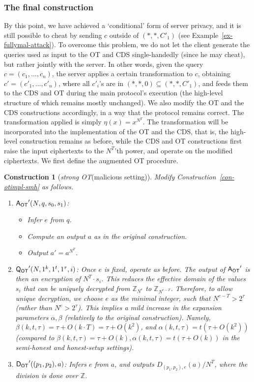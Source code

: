 \documentclass[11pt]{article}
\newtheorem{construction}[theorem]{Construction}
\newcommand{\queot}{{\sf Q_{OT}}}
\newcommand{\ansot}{{\sf A_{OT}}}
\newcommand{\decot}{{\sf D_{OT}}}
\newcommand{\otl}{{\tau}}
\newcommand{\decdj}{{D}_{(p_1,p_2),e}}
\newcommand{\Z}{\mathbb{Z}}
\newcommand\ot{\mbox{OT}\xspace}
\newcommand\strongot{{\em strong \ot\xspace}}
\begin{document}
\subsubsection{The final construction}
\label{subsec-mal-uncond}
By this point, we have achieved a `conditional' form of server privacy, and it is still possible
to cheat by sending $c$ outside of $(*,*,C'_1)$ (see Example~\ref{ex-fullymal-attack}).
To overcome this problem, we do not let the client
generate the queries used as input to the \ot and CDS single-handedly (since he may cheat), but rather
jointly with the server. In other words, given the query $c=(c_1,\ldots,c_n)$, the server applies a certain transformation to $c$, obtaining $c'=(c'_1,\ldots,c'_n)$, where all $c'_i$'s are in $(*,*,0)\subseteq{(*,*,C'_1)}$, and feeds them to the CDS and \ot during the main protocol's execution (the high-level structure of which remains mostly unchanged). We also modify the \ot and the CDS constructions accordingly, in a way that the protocol remains correct.
The transformation applied is simply $\eta(x)=x^{N^T}$. The transformation will be incorporated into the implementation of the \ot and the CDS, that is, the high-level construction remains as before, while the CDS and \ot constructions first raise the input ciphertexts to the $N^T$'th power, and operate on the modified ciphertexts. We first define the augmented \ot procedure.
\begin{construction}[\strongot (malicious setting)]
  \label{con-otimpl-mal}
  Modify Construction~\ref{con-otimpl-smh} as follows.
  \begin{enumerate}
    \item $\ansot'(N,q,s_0,s_1)$:
    \begin{itemize}
      \item Infer $e$ from $q$.
      \item Compute an output $a$ as in the original construction.
      \item Output $a'=a^{N^T}$.
    \end{itemize}
    \item $\queot'(N,1^k,1^t,1^{\otl},i)$:
    Once $e$ is fixed, operate as before.
    The output of $\ansot'$ is then an encryption of $N^T\cdot s_i$.
    This reduces the effective domain of the values $s_i$ that can be uniquely decrypted from $\Z_{N^e}$
    to $\Z_{N^{e-T}}$. Therefore, to allow unique decryption, we choose $e$ as the minimal integer,
    such that $N^{e-T}>2^{\otl}$ (rather than $N^e>2^{\otl}$). This implies a mild increase in the expansion
    parameters $\alpha,\beta$ (relatively to the original construction). Namely, $\beta(k,t,\otl)=\otl+O(k\cdot T)=\otl+O(k^2)$, and $\alpha(k,t,\otl)=t(\otl+O(k^2))$ (compared to $\beta(k,t,\otl)=\otl+O(k),\alpha(k,t,\otl)=t(\otl+O(k))$ in the semi-honest
    and honest-setup settings).
    \item $\decot'((p_1,p_2),a)$: Infers $e$ from $a$, and outputs $\decdj(a)/N^T$, where the division is done over
    $\Z$.
  \end{enumerate}
\end{construction}
\end{document}
